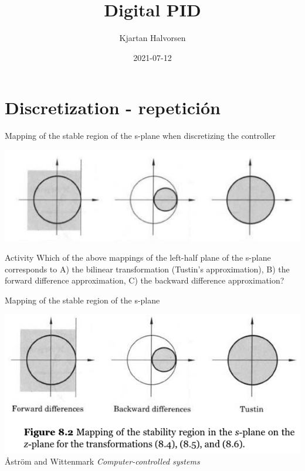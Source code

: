 \documentclass[presentation,aspectratio=1610]{beamer}
\author{Kjartan Halvorsen}
\date{2021-07-12}
\title{Digital PID}
\begin{document}
\maketitle


\section{Discretization - repetición}
\label{sec:org2a507e9}
\begin{frame}[label={sec:org7dfdbb8}]{Mapping of the stable region of the s-plane when discretizing the controller}
\pause

\begin{center}
 \includegraphics[width=0.7\linewidth]{../../figures/mapping-stable-s-region.png}\\
\end{center}

\pause

\alert{Activity} Which of the above mappings of the left-half plane of the s-plane corresponds to A) the bilinear transformation (Tustin's approximation), B) the forward difference approximation, C) the backward difference approximation?
\end{frame}

\begin{frame}[label={sec:orgb3452e6}]{Mapping of the stable region of the s-plane}
\begin{center}
 \includegraphics[width=0.79\linewidth]{../../figures/fig8-2.png}\\
{\tiny Åström and Wittenmark \emph{Computer-controlled systems}}
\end{center}
\end{frame}
\end{document}
